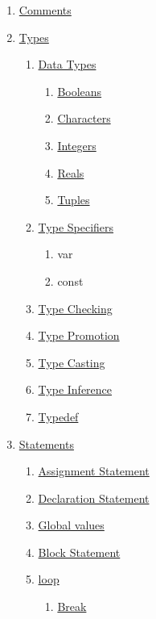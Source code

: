 \documentclass{article}
\begin{document}
  \begin{enumerate}[label*=\arabic*]
    \item \hyperref[sec:comments]{Comments}
    \item \hyperref[sec:types]{Types}
    \begin{enumerate}[label*=.\arabic*]
      \item \hyperref[sec:types]{Data Types}
      \begin{enumerate}[label*=.\arabic*]
        \item \hyperref[ssec:boolean]{Booleans}
        \item \hyperref[ssec:character]{Characters}
        \item \hyperref[ssec:integer]{Integers}
        \item \hyperref[ssec:real]{Reals}
        \item \hyperref[ssec:tuple]{Tuples}
      \end{enumerate}
      \item \hyperref[sec:typeSpecifiers]{Type Specifiers}
      \begin{enumerate}[label*=.\arabic*]
        \item var
        \item const
      \end{enumerate}
      \item \hyperref[sec:typeChecking]{Type Checking}
      \item \hyperref[sec:typePromotion]{Type Promotion}
      \item \hyperref[sec:typeCasting]{Type Casting}
      \item \hyperref[sec:typeInference]{Type Inference}
      \item \hyperref[sec:typedef]{Typedef}
    \end{enumerate}
    \item \hyperref[sec:statements]{Statements}
    \begin{enumerate}[label*=.\arabic*]
      \item \hyperref[sec:assignment]{Assignment Statement}
      \item \hyperref[sec:declaration]{Declaration Statement}
      \item \hyperref[sec:global]{Global values}
      \item \hyperref[sec:block]{Block Statement}
      \item \hyperref[sec:loop]{loop}
      \begin{enumerate}[label*=.\arabic*]
        \item \hyperref[sec:break]{Break}

\end{enumerate}
\end{enumerate}
\end{enumerate}
\end{document}
